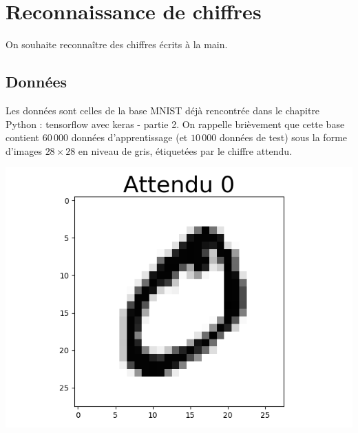 \documentclass[11pt,class=report,crop=false]{standalone}
\begin{document}



\section{Reconnaissance de chiffres}

On souhaite reconnaître des chiffres écrits à la main.

\subsection{Données}


Les données sont celles de la base  MNIST déjà rencontrée dans le chapitre \og{}Python : tensorflow avec keras - partie 2\fg{}.
On rappelle brièvement que cette base contient $60\,000$ données d'apprentissage (et $10\,000$ données de test) sous la forme d'images $28\times28$ en niveau de gris, étiquetées par le chiffre attendu.
\begin{center}
\includegraphics[scale=\myscale,scale=0.5]{figures/tfconv-chiffre-train-1}
\end{center}
\end{document}
